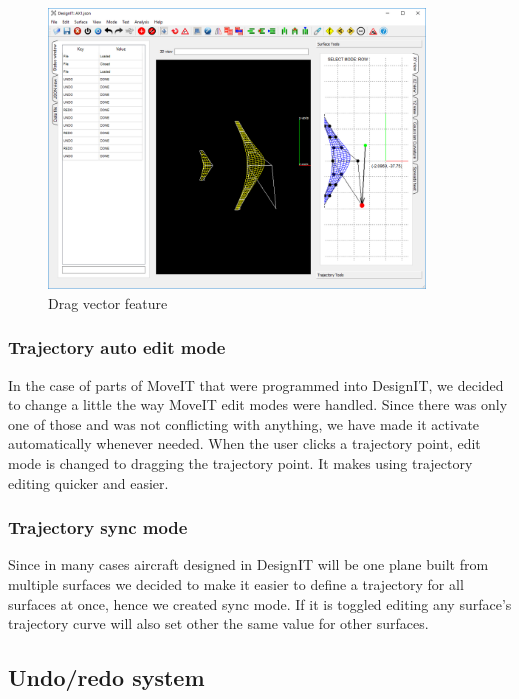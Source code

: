 \documentclass[a4paper, 11pt, article]{report}
\begin{document}
\begin{figure}[!h]
	\centering
	
	\includegraphics[width=10cm]{images/drag_vector.png}
	
	\caption{Drag vector feature}
	
	\label{dragVector}
\end{figure}

\subsubsection{Trajectory auto edit mode}

In the case of parts of MoveIT that were programmed into DesignIT, we decided to change a little the way MoveIT edit modes were handled. Since there was only one of those and was not conflicting with anything, we have made it activate automatically whenever needed. When the user clicks a trajectory point, edit mode is changed to dragging the trajectory point. It makes using trajectory editing quicker and easier.

\subsubsection{Trajectory sync mode}

Since in many cases aircraft designed in DesignIT will be one plane built from multiple surfaces we decided to make it easier to define a trajectory for all surfaces at once, hence we created sync mode. If it is toggled editing any surface's trajectory curve will also set other the same value for other surfaces.

\subsection{Undo/redo system}
\end{document}
